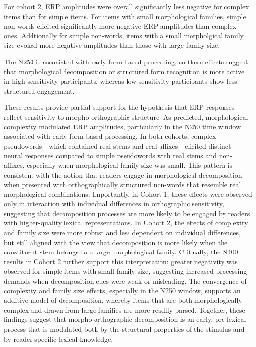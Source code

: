 \documentclass[preprint,12pt, authoryear, review]{elsarticle}
\begin{document}
For cohort 2, ERP amplitudes were overall significantly less negative for complex items than for simple items. For items with small morphological families, simple non-words elicited significantly more negative ERP amplitudes than complex ones. Addtionally for simple non-words, items with a small morpholgical family size evoked more negative amplitudes than those with large family size.


The N250 is associated with early form-based processing, so these effects suggest that morphological decomposition or structured form recognition is more active in high-sensitivity participants, whereas low-sensitivity participants show less structured engagement. 

 

These results provide partial support for the hypothesis that ERP responses reflect sensitivity to morpho-orthographic structure. As predicted, morphological complexity modulated ERP amplitudes, particularly in the N250 time window associated with early form-based processing. In both cohorts, complex pseudowords—which contained real stems and real affixes—elicited distinct neural responses compared to simple pseudowords with real stems and non-affixes, especially when morphological family size was small. This pattern is consistent with the notion that readers engage in morphological decomposition when presented with orthographically structured non-words that resemble real morphological combinations. Importantly, in Cohort 1, these effects were observed only in interaction with individual differences in orthographic sensitivity, suggesting that decomposition processes are more likely to be engaged by readers with higher-quality lexical representations. In Cohort 2, the effects of complexity and family size were more robust and less dependent on individual differences, but still aligned with the view that decomposition is more likely when the constituent stem belongs to a large morphological family. Critically, the N400 results in Cohort 2 further support this interpretation: greater negativity was observed for simple items with small family size, suggesting increased processing demands when decomposition cues were weak or misleading. The convergence of complexity and family size effects, especially in the N250 window, supports an additive model of decomposition, whereby items that are both morphologically complex and drawn from large families are more readily parsed. Together, these findings suggest that morpho-orthographic decomposition is an early, pre-lexical process that is modulated both by the structural properties of the stimulus and by reader-specific lexical knowledge.




\end{document}
